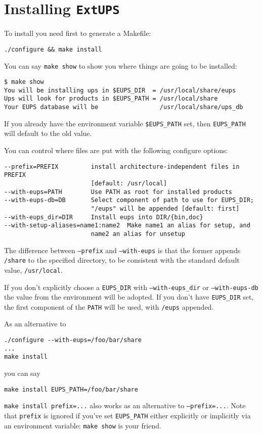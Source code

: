 \documentclass{article}
\newcommand{\code}[1]{\texttt{#1}}
\newcommand{\eups}{\code{ExtUPS}}
\begin{document}
\section{Installing \eups{}}
  
  To install you need first to generate a Makefile:
\begin{verbatim}
./configure && make install
\end{verbatim}

You can say \code{make show} to show you where things are
going to be installed:
\begin{verbatim}
$ make show
You will be installing ups in $EUPS_DIR  = /usr/local/share/eups
Ups will look for products in $EUPS_PATH = /usr/local/share
Your EUPS database will be                 /usr/local/share/ups_db
\end{verbatim}				%
If you already have the environment variable \code{\$EUPS\_PATH} set,
then \code{EUPS\_PATH} will default to the old value.

You can control where files are put with the following configure options:
\begin{verbatim}
--prefix=PREFIX         install architecture-independent files in PREFIX
                        [default: /usr/local]
--with-eups=PATH        Use PATH as root for installed products
--with-eups-db=DB       Select component of path to use for EUPS_DIR;
                        "/eups" will be appended [default: first]
--with-eups_dir=DIR     Install eups into DIR/{bin,doc}
--with-setup-aliases=name1:name2  Make name1 an alias for setup, and
                        name2 an alias for unsetup
\end{verbatim}
The difference between \code{--prefix} and \code{--with-eups}
is that the former appends \code{/share} to the specified directory, to
be consistent with the standard default value, \code{/usr/local}.

If you don't explicitly choose a \code{EUPS\_DIR} with
\code{--with-eups\_dir} or \code{--with-eups-db} the value from the
environment will be adopted. If you don't have \code{EUPS\_DIR} set,
the first component of the \code{PATH} will be used, with \code{/eups}
appended.
  
As an alternative to
\begin{verbatim}
./configure --with-eups=/foo/bar/share
...
make install
\end{verbatim}
you can say
\begin{verbatim}
make install EUPS_PATH=/foo/bar/share
\end{verbatim}
\code{make install prefix=...} also works as an alternative to \code{--prefix=...}.
Note that \code{prefix} is ignored if you've set \code{EUPS\_PATH} either explicitly
or implicitly via an environment variable; \code{make show} is your friend.
\end{document}

